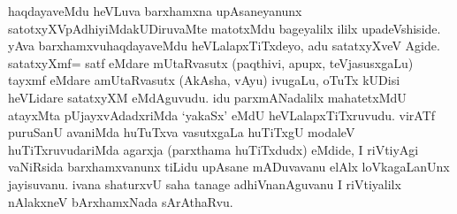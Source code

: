 \begin{artha}
haqdayaveMdu heVLuva barxhamxna upAsaneyanunx satotxyXVpAdhiyiMda\break kUDiruvaMte matotxMdu bageyalilx ililx upadeVshiside. yAva barxhamxvu\break haqdayaveMdu heVLalapxTiTxdeyo, adu satatxyXveV Agide.  satatxyXmf= satf eMdare mUtaRvasutx (paqthivi, apupx, teVjasusxgaLu) tayxmf eMdare amUtaRvasutx (AkAsha, vAyu) ivugaLu, oTuTx kUDisi heVLidare satatxyXM eMdAguvudu. idu parxmANadalilx mahatetxMdU atayxMta pUjayxvAdadxriMda `yakaSx' eMdU heVLalapxTiTxruvudu. virATf puruSanU avaniMda huTuTxva vasutxgaLa huTiTxgU modaleV huTiTxruvudariMda agarxja (parxthama huTiTxdudx) eMdide, I riVtiyAgi vaNiRsida barxhamxvanunx tiLidu upAsane mADuvavanu elAlx loVkagaLanUnx jayisuvanu. ivana shaturxvU saha tanage adhiVnanAguvanu I riVtiyalilx nAlakxneV bArxhamxNada sArAthaRvu.
\end{artha}


